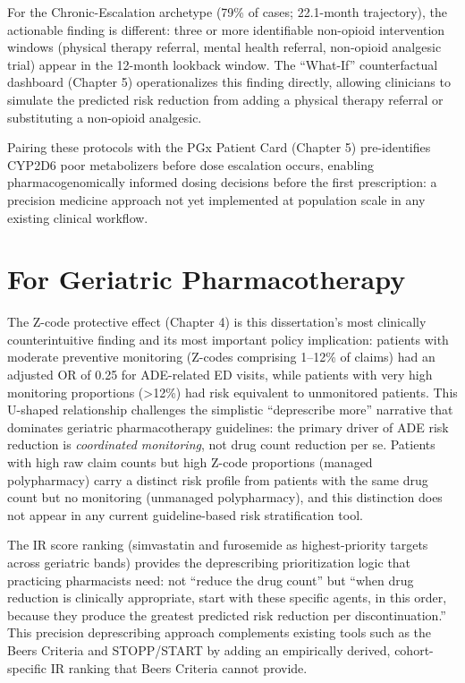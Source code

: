 \documentclass[
  12pt,
]{book}
\begin{document}
For the Chronic-Escalation archetype (79\% of cases; 22.1-month
trajectory), the actionable finding is different: three or more
identifiable non-opioid intervention windows (physical therapy referral,
mental health referral, non-opioid analgesic trial) appear in the
12-month lookback window. The ``What-If'' counterfactual dashboard
(Chapter 5) operationalizes this finding directly, allowing clinicians
to simulate the predicted risk reduction from adding a physical therapy
referral or substituting a non-opioid analgesic.

Pairing these protocols with the PGx Patient Card (Chapter 5)
pre-identifies CYP2D6 poor metabolizers before dose escalation occurs,
enabling pharmacogenomically informed dosing decisions before the first
prescription: a precision medicine approach not yet implemented at
population scale in any existing clinical workflow.

\section{For Geriatric
Pharmacotherapy}\label{for-geriatric-pharmacotherapy}

The Z-code protective effect (Chapter 4) is this dissertation's most
clinically counterintuitive finding and its most important policy
implication: patients with moderate preventive monitoring (Z-codes
comprising 1--12\% of claims) had an adjusted OR of 0.25 for ADE-related
ED visits, while patients with very high monitoring proportions
(\textgreater12\%) had risk equivalent to unmonitored patients. This
U-shaped relationship challenges the simplistic ``deprescribe more''
narrative that dominates geriatric pharmacotherapy guidelines: the
primary driver of ADE risk reduction is \emph{coordinated monitoring},
not drug count reduction per se. Patients with high raw claim counts but
high Z-code proportions (\textquotesingle managed
polypharmacy\textquotesingle) carry a distinct risk profile from
patients with the same drug count but no monitoring
(\textquotesingle unmanaged polypharmacy\textquotesingle), and this
distinction does not appear in any current guideline-based risk
stratification tool.

The IR score ranking (simvastatin and furosemide as highest-priority
targets across geriatric bands) provides the deprescribing
prioritization logic that practicing pharmacists need: not ``reduce the
drug count'' but ``when drug reduction is clinically appropriate, start
with these specific agents, in this order, because they produce the
greatest predicted risk reduction per discontinuation.'' This precision
deprescribing approach complements existing tools such as the Beers
Criteria and STOPP/START by adding an empirically derived,
cohort-specific IR ranking that Beers Criteria cannot provide.
\end{document}

